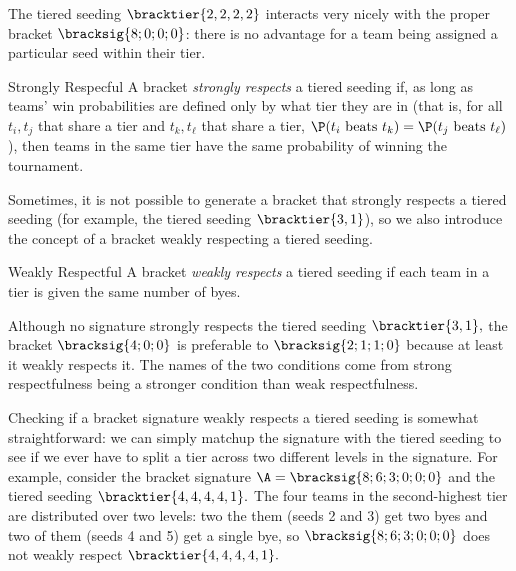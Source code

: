 {    The tiered seeding $\bracktier{2,2,2,2}$ interacts very nicely with the proper bracket $\bracksig{8;0;0;0}$: there is no advantage for a team being assigned a particular seed within their tier.

    \begin{definition}{Strongly Respecful}{}
        A bracket \textit{strongly respects} a tiered seeding if, as long as teams' win probabilities are defined only by what tier they are in (that is, for all $t_i, t_j$ that share a tier and $t_k, t_\ell$ that share a tier, $\P(t_i \textrm{ beats } t_k) = \P(t_j \textrm{ beats } t_\ell)$), then teams in the same tier have the same probability of winning the tournament.
    \end{definition}

    Sometimes, it is not possible to generate a bracket that strongly respects a tiered seeding (for example, the tiered seeding $\bracktier{3, 1}$), so we also introduce the concept of a bracket weakly respecting a tiered seeding.

    \begin{definition}{Weakly Respectful}{}
        A bracket \textit{weakly respects} a tiered seeding if each team in a tier is given the same number of byes.
    \end{definition}

    Although no signature strongly respects the tiered seeding $\bracktier{3, 1},$ the bracket $\bracksig{4;0;0}$ is preferable to $\bracksig{2;1;1;0}$ because at least it weakly respects it. The names of the two conditions come from strong respectfulness being a stronger condition than weak respectfulness.


    Checking if a bracket signature weakly respects a tiered seeding is somewhat straightforward: we can simply matchup the signature with the tiered seeding to see if we ever have to split a tier across two different levels in the signature. For example, consider the bracket signature $\A = \bracksig{8;6;3;0;0;0}$ and the tiered seeding $\bracktier{4,4,4,4,1}.$ The four teams in the second-highest tier are distributed over two levels: two the them (seeds 2 and 3) get two byes and two of them (seeds 4 and 5) get a single bye, so $\bracksig{8;6;3;0;0;0}$ does not weakly respect $\bracktier{4,4,4,4,1}.$

}
